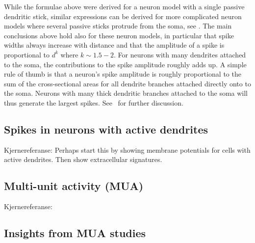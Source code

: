 While the formulae above were derived for a neuron model with a single passive dendritic stick, similar expressions can be derived for 
more complicated neuron models where several passive sticks protrude from the soma, see \citet{Pettersen2008}.
The main conclusions above hold also for these neuron models, in particular that spike widths always increase with distance and that
the amplitude of a spike is proportional to $d^{k}$ where $k\sim1.5-2$. For neurons with many dendrites attached to the 
soma, the contributions to the spike amplitude roughly adds up. A simple rule of thumb is that a neuron's spike amplitude is 
roughly proportional to the sum of the cross-sectional areas for all dendrite branches attached directly onto to the soma. Neurons with many thick
dendritic branches attached to the soma will thus generate the largest spikes. See~\citet{Pettersen2008} for further discussion.


\subsection{Spikes in neurons with active dendrites} 
Kjernereferanse: \citep{Gold2006}
Perhaps start this by showing membrane potentials for cells with active dendrites. 
Then show extracellular signatures.

\subsection{Multi-unit activity (MUA)} 
Kjernereferanse: \citep{Pettersen2008}

\subsection{Insights from MUA studies} 
